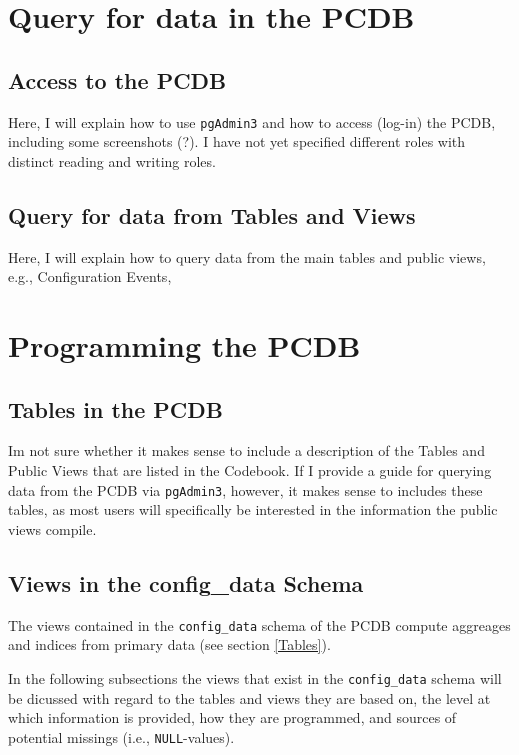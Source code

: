 \documentclass[%
parskip=half-,%
fontsize=12pt,%
DIV=13,%
oneside,%
english,%
abstract=off,%
toc=chapterentrywithdots,toc=bibnumbered]{scrreprt}
\begin{document}
\chapter{Query for data in the PCDB}\label{Chapter_Query_the_PCDB}


\section{Access to the PCDB}
Here, I will explain how to use \texttt{\footnotesize pgAdmin3} and how to access (log-in) the PCDB, including some screenshots (?).
I have not yet specified different roles with distinct reading and writing roles.

\newpage
\section{Query for data from Tables and Views}
Here, I will explain how to query data from the main tables and public views, e.g., Configuration Events, 

\newpage
\chapter{Programming the PCDB}

\section{Tables in the PCDB}
Im not sure whether it makes sense to include a description of the Tables and Public Views that are listed in the Codebook.
If I provide a guide for querying data from the PCDB via \texttt{\footnotesize pgAdmin3}, however, it makes sense to includes these tables, as most users will specifically be interested in the information 
the public views compile.

\newpage
\section{Views in the config\_data Schema}\label{Views_in_config_data_schema}
The views contained in the \texttt{\footnotesize config\_data} schema of the PCDB compute aggreages and indices from primary data (see section \ref{Tables}).

In the following subsections the views that exist in the \texttt{\footnotesize config\_data} schema will be dicussed with regard to the tables and views they are based on, the level at which information is provided, how they are programmed, and sources of potential missings (i.e., \texttt{\footnotesize NULL}-values).
\end{document}
